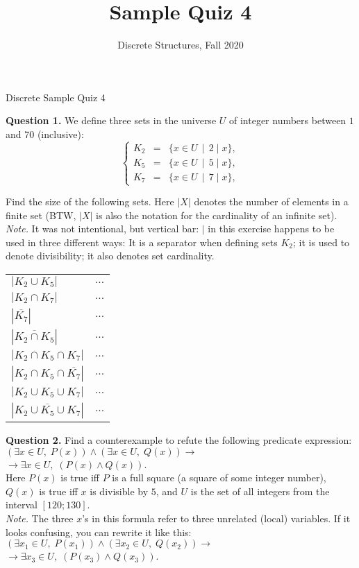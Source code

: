 \documentclass[jou]{apa6}
\title{Sample Quiz 4}
\author{Discrete Structures, Fall 2020}
\affiliation{RBS}
\begin{document}
\thispagestyle{empty}

\twocolumn
{\Large Discrete Sample Quiz 4}

\vspace{10pt}
{\bf Question 1.} We define three sets in the universe $U$ of integer numbers
between $1$ and $70$ (inclusive):
$$\left\{ \begin{array}{rcl}
K_2 & = & \{ x \in U \,\mid\, 2 \mid x \},\\
K_5 & = & \{ x \in U \,\mid\, 5 \mid x \},\\
K_7 & = & \{ x \in U \,\mid\, 7 \mid x \},
\end{array} \right.$$

Find the size of the following sets.
Here $|X|$ denotes the number of elements in a finite set
(BTW, $|X|$ is also the notation for the cardinality of an infinite set).\\
{\em Note.} It was not intentional, but vertical bar: $\mid$
in this exercise happens to be used in three different ways: 
It is a separator when defining sets $K_2$; it is used to denote
divisibility; it also denotes set cardinality.

\begin{tabular}{ll} 
$\left| K_2 \cup K_5 \right|$ & $\ldots$ \\ 
$\left| K_2 \cap K_7 \right|$ & $\ldots$ \\ 
$\left| \overline{K_7} \right|$ & $\ldots$ \\
$\left| \overline{K_2 \cap K_5} \right|$ & $\ldots$ \\
$\left| K_2 \cap K_5 \cap K_7 \right|$ & $\ldots$ \\ 
$\left| K_2 \cap K_5 \cap \overline{K_7} \right|$ & $\ldots$ \\ 
$\left| K_2 \cup K_5 \cup K_7 \right|$ & $\ldots$ \\ 
$\left| \overline{K_2 \cup K_5 \cup K_7} \right|$ & $\ldots$ \\ 
\end{tabular}


\vspace{6pt}
{\bf Question 2.}
Find a counterexample to refute the following predicate expression:\\
$(\exists x \in U,\;P(x)) \wedge (\exists x\in U,\;Q(x)) \rightarrow$\\
$\rightarrow \exists x\in U,\;(P(x) \wedge Q(x))$.\\
Here $P(x)$ is true iff $P$ is a full square (a square of some integer number), 
$Q(x)$ is true iff $x$ is divisible by $5$, and $U$ is the set of all integers 
from the interval $[120;130]$.\\
{\em Note.} The three $x$'s in this formula refer to 
three unrelated (local) variables. 
If it looks confusing, you can rewrite it like this:\\
$(\exists x_1 \in U,\;P(x_1)) \wedge (\exists x_2\in U,\;Q(x_2)) \rightarrow$\\
$\rightarrow \exists x_3\in U,\;(P(x_3) \wedge Q(x_3))$.
\end{document}
